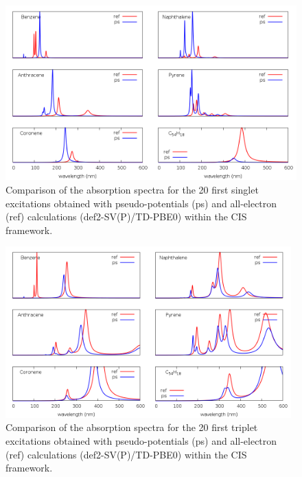 \documentclass[aip]{revtex4-1}
\begin{document}
\begin{figure}
\begin{center}
\includegraphics[width=16cm]{grand_ciss}
\end{center}
\vspace{0.25in}
\hspace*{3in}
\caption{Comparison of the absorption spectra for the 20 first singlet excitations obtained with
pseudo-potentials (ps) and all-electron (ref) calculations (def2-SV(P)/TD-PBE0) within the CIS
framework.}
\label{fig:cnhn_uv_cist}
\end{figure}

\begin{figure}
\begin{center}
\includegraphics[width=11cm]{grand_cist}
\end{center}
\vspace{0.25in}
\hspace*{3in}
\caption{Comparison of the absorption spectra for the 20 first triplet excitations obtained with
pseudo-potentials (ps) and all-electron (ref) calculations (def2-SV(P)/TD-PBE0) within the CIS
framework.}
\label{fig:cnhn_uv_ciss}
\end{figure}
\end{document}
